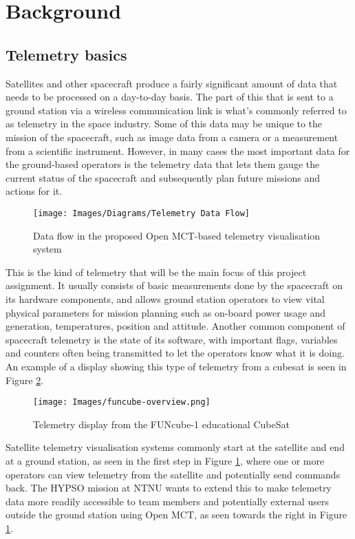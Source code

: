\section{Background}

\subsection{Telemetry basics}
Satellites and other spacecraft produce a fairly significant amount of data that needs to be processed on a day-to-day basis. The part of this that is sent to a ground station via a wireless communication link is what's commonly referred to as \gls{telemetry} in the space industry. Some of this data may be unique to the mission of the spacecraft, such as image data from a camera or a measurement from a scientific instrument. However, in many cases the most important data for the ground-based operators is the telemetry data that lets them gauge the current status of the spacecraft and subsequently plan future missions and actions for it.

\begin{figure}[H]
    \centering
    \texttt{[image: Images/Diagrams/Telemetry Data Flow]}
    \caption{Data flow in the proposed Open MCT-based telemetry visualisation system}
    \label{fig:telemetryflow}
\end{figure}

This is the kind of telemetry that will be the main focus of this project assignment. It usually consists of basic measurements done by the spacecraft on its hardware components, and allows ground station operators to view vital physical parameters for mission planning such as on-board power usage and generation, temperatures, position and attitude. Another common component of spacecraft telemetry is the state of its software, with important flags, variables and counters often being transmitted to let the operators know what it is doing. An example of a display showing this type of telemetry from a \Gls{cubesat} is seen in Figure \ref{fig:funcube}.

\begin{figure}[ht]
    \centering
    \texttt{[image: Images/funcube-overview.png]}
    \caption{Telemetry display from the FUNcube-1 educational CubeSat \cite{funcube}}
    \label{fig:funcube}
\end{figure}

Satellite telemetry visualisation systems commonly start at the satellite and end at a ground station, as seen in the first step in Figure \ref{fig:telemetryflow}, where one or more operators can view telemetry from the satellite and potentially send commands back. The HYPSO mission at NTNU wants to extend this to make telemetry data more readily accessible to team members and potentially external users outside the ground station using Open MCT, as seen towards the right in Figure \ref{fig:telemetryflow}.

